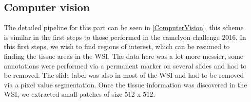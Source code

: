 \documentclass[a4paper,10pt]{article}
\begin{document}
\subsection{Computer vision}

The detailed pipeline for this part can be seen in \ref{ComputerVision}, this scheme is similar in the first steps to those performed in the camelyon challenge 2016. In this first steps, we wish to find regions of interest, which can be resumed to finding the tissue areas in the WSI. The data here was a lot more messier, some annotations were performed via a permanent marker on several slides and had to be removed. The slide label was also in most of the WSI and had to be removed via a pixel value segmentation. Once the tissue information was discovered in the WSI, we extracted small patches of size 512 x 512.
\end{document}
